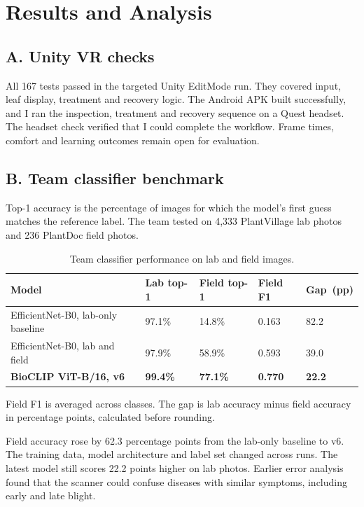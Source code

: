 \documentclass[a4paper,11pt]{article}
\newcommand{\tabhead}[1]{\leavevmode\textbf{#1}}
\newcommand{\smallnote}[1]{{\small #1\par}}
\begin{document}
\clearpage
\section{Results and Analysis}
\subsection*{A. Unity VR checks}
All 167 tests passed in the targeted Unity EditMode run. They covered input, leaf display, treatment and recovery logic. The Android APK built successfully, and I ran the inspection, treatment and recovery sequence on a Quest headset. The headset check verified that I could complete the workflow. Frame times, comfort and learning outcomes remain open for evaluation.

\subsection*{B. Team classifier benchmark}
Top-1 accuracy is the percentage of images for which the model's first guess matches the reference label. The team tested on 4,333 PlantVillage lab photos and 236 PlantDoc field photos.

\begin{table}[!ht]
\caption{Team classifier performance on lab and field images.}\label{tab:results}
\vspace{3pt}
\begin{tabularx}{\linewidth}{@{}LN{.125\linewidth}N{.142\linewidth}N{.106\linewidth}N{.12\linewidth}@{}}
\toprule
\tabhead{Model} & \tabhead{Lab top-1} & \tabhead{Field top-1} & \tabhead{Field F1} & \tabhead{\mbox{Gap (pp)}}\\
\midrule
EfficientNet-B0, lab-only baseline & 97.1\% & 14.8\% & 0.163 & 82.2\\
EfficientNet-B0, lab and field & 97.9\% & 58.9\% & 0.593 & 39.0\\
\textbf{BioCLIP ViT-B/16, v6} & \textbf{99.4\%} & \textbf{77.1\%} & \textbf{0.770} & \textbf{22.2}\\
\bottomrule
\end{tabularx}
\vspace{3pt}
\smallnote{Field F1 is averaged across classes. The gap is lab accuracy minus field accuracy in percentage points, calculated before rounding.}
\end{table}

Field accuracy rose by 62.3 percentage points from the lab-only baseline to v6. The training data, model architecture and label set changed across runs. The latest model still scores 22.2 points higher on lab photos. Earlier error analysis found that the scanner could confuse diseases with similar symptoms, including early and late blight.
\end{document}
